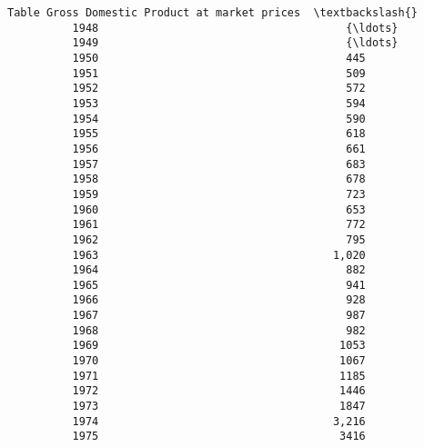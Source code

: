 \documentclass[11pt]{article}
\begin{document}
\begin{Verbatim}[commandchars=\\\{\}]
          Table Gross Domestic Product at market prices  \textbackslash{}
          1948                                      {\ldots}   
          1949                                      {\ldots}   
          1950                                      445   
          1951                                      509   
          1952                                      572   
          1953                                      594   
          1954                                      590   
          1955                                      618   
          1956                                      661   
          1957                                      683   
          1958                                      678   
          1959                                      723   
          1960                                      653   
          1961                                      772   
          1962                                      795   
          1963                                    1,020   
          1964                                      882   
          1965                                      941   
          1966                                      928   
          1967                                      987   
          1968                                      982   
          1969                                     1053   
          1970                                     1067   
          1971                                     1185   
          1972                                     1446   
          1973                                     1847   
          1974                                    3,216   
          1975                                     3416   
          

\end{Verbatim}
\end{document}
